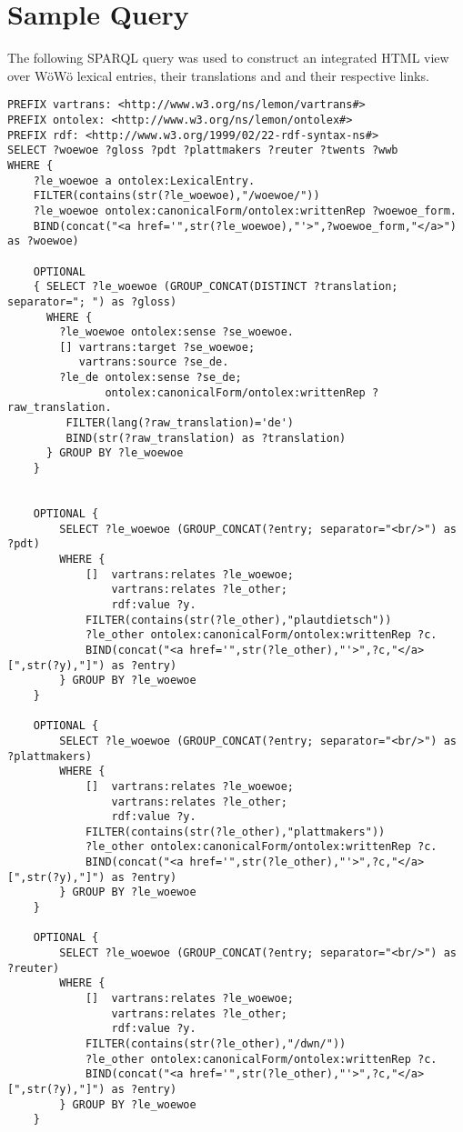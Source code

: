 \section{Sample Query}
\label{appendix-sparql}

The following SPARQL query was used to construct an integrated HTML view over WöWö lexical entries, their translations and and their respective links.

{\small
\begin{verbatim}
PREFIX vartrans: <http://www.w3.org/ns/lemon/vartrans#>
PREFIX ontolex: <http://www.w3.org/ns/lemon/ontolex#>
PREFIX rdf: <http://www.w3.org/1999/02/22-rdf-syntax-ns#>
SELECT ?woewoe ?gloss ?pdt ?plattmakers ?reuter ?twents ?wwb
WHERE {
	?le_woewoe a ontolex:LexicalEntry.
	FILTER(contains(str(?le_woewoe),"/woewoe/"))
	?le_woewoe ontolex:canonicalForm/ontolex:writtenRep ?woewoe_form.
	BIND(concat("<a href='",str(?le_woewoe),"'>",?woewoe_form,"</a>") as ?woewoe)
	
	OPTIONAL
	{ SELECT ?le_woewoe (GROUP_CONCAT(DISTINCT ?translation; separator="; ") as ?gloss)
	  WHERE {
	    ?le_woewoe ontolex:sense ?se_woewoe.
	  	[] vartrans:target ?se_woewoe;
	  	   vartrans:source ?se_de.
	  	?le_de ontolex:sense ?se_de;
	  	       ontolex:canonicalForm/ontolex:writtenRep ?raw_translation.
	  	 FILTER(lang(?raw_translation)='de')
	  	 BIND(str(?raw_translation) as ?translation)
	  } GROUP BY ?le_woewoe
	}


	OPTIONAL { 
		SELECT ?le_woewoe (GROUP_CONCAT(?entry; separator="<br/>") as ?pdt)
		WHERE {
			[] 	vartrans:relates ?le_woewoe;
				vartrans:relates ?le_other;
				rdf:value ?y.
			FILTER(contains(str(?le_other),"plautdietsch"))
			?le_other ontolex:canonicalForm/ontolex:writtenRep ?c.
            BIND(concat("<a href='",str(?le_other),"'>",?c,"</a> [",str(?y),"]") as ?entry)
		} GROUP BY ?le_woewoe 
	}

	OPTIONAL { 
		SELECT ?le_woewoe (GROUP_CONCAT(?entry; separator="<br/>") as ?plattmakers)
		WHERE {
			[] 	vartrans:relates ?le_woewoe;
				vartrans:relates ?le_other;
				rdf:value ?y.
			FILTER(contains(str(?le_other),"plattmakers"))
			?le_other ontolex:canonicalForm/ontolex:writtenRep ?c.
            BIND(concat("<a href='",str(?le_other),"'>",?c,"</a> [",str(?y),"]") as ?entry)
		} GROUP BY ?le_woewoe 
	}

	OPTIONAL { 
		SELECT ?le_woewoe (GROUP_CONCAT(?entry; separator="<br/>") as ?reuter)
		WHERE {
			[] 	vartrans:relates ?le_woewoe;
				vartrans:relates ?le_other;
				rdf:value ?y.
			FILTER(contains(str(?le_other),"/dwn/"))
			?le_other ontolex:canonicalForm/ontolex:writtenRep ?c.
            BIND(concat("<a href='",str(?le_other),"'>",?c,"</a> [",str(?y),"]") as ?entry)
		} GROUP BY ?le_woewoe 
	}


\end{verbatim}}
